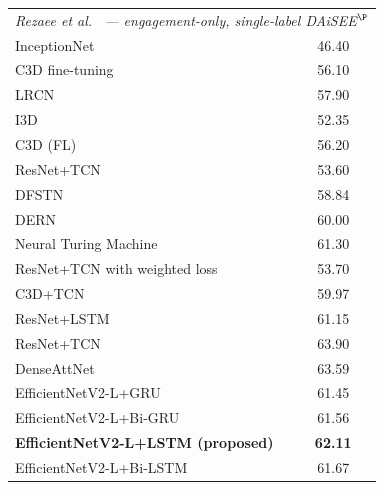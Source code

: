 \begin{table}[H]
\begin{threeparttable}
\begin{tabular}{p{4.2cm} c p{3.2cm}}
\midrule
\multicolumn{3}{l}{\textit{Rezaee et al.\ \cite{rezaee_detection_2024} --- engagement-only, single-label \ac{DAiSEE}$^{\P}$}} \\
InceptionNet                              & 46.40 & \cite{rezaee_detection_2024} \\
C3D fine-tuning                           & 56.10 & \cite{rezaee_detection_2024} \\
LRCN                                      & 57.90 & \cite{rezaee_detection_2024} \\
I3D                                       & 52.35 & \cite{rezaee_detection_2024} \\
C3D (FL)                                  & 56.20 & \cite{rezaee_detection_2024} \\
ResNet+\ac{TCN}                                & 53.60 & \cite{rezaee_detection_2024} \\
DFSTN                                     & 58.84 & \cite{rezaee_detection_2024} \\
DERN                                      & 60.00 & \cite{rezaee_detection_2024} \\
Neural Turing Machine                     & 61.30 & \cite{rezaee_detection_2024} \\
ResNet+\ac{TCN} with weighted loss             & 53.70 & \cite{rezaee_detection_2024} \\
C3D+\ac{TCN}                                   & 59.97 & \cite{rezaee_detection_2024} \\
ResNet+\ac{LSTM}                               & 61.15 & \cite{rezaee_detection_2024} \\
ResNet+\ac{TCN}                                & 63.90 & \cite{rezaee_detection_2024} \\
DenseAttNet                               & 63.59 & \cite{rezaee_detection_2024} \\
EfficientNetV2-L+\ac{GRU}                      & 61.45 & \cite{rezaee_detection_2024} \\
EfficientNetV2-L+Bi-\ac{GRU}                   & 61.56 & \cite{rezaee_detection_2024} \\
\textbf{EfficientNetV2-L+\ac{LSTM} (proposed)} & \textbf{62.11} & \cite{rezaee_detection_2024} \\
EfficientNetV2-L+Bi-\ac{LSTM}                  & 61.67 & \cite{rezaee_detection_2024} \\
\bottomrule
\end{tabular}
\begin{tablenotes}
\footnotesize

\end{tablenotes}
\end{threeparttable}
\end{table}
